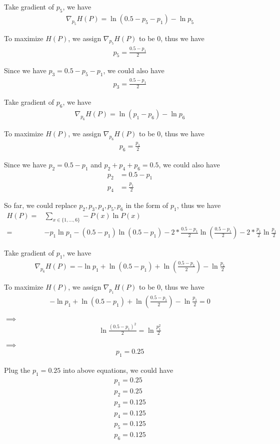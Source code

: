 \documentclass[twoside,11pt]{homework}
\begin{document}
Take gradient of $p_5$, we have 
\begin{align*}
\nabla_{p_5}H(P) = \ln(0.5 - p_5 - p_1) - \ln p_5
\end{align*}

To maximize $H(P)$, we assign $\nabla_{p_5}H(P)$ to be 0, thus we have 
\begin{align*}
p_5 = \frac {0.5 - p_1}{ 2}
\end{align*}


Since we have $p_3 = 0.5 - p_5 - p_1$, we could also have 
\begin{align*}
p_3 = \frac {0.5 - p_1}{ 2}
\end{align*}


Take gradient of $p_6$, we have 
\begin{align*}
\nabla_{p_6}H(P) = \ln(p_1 - p_6) - \ln p_6
\end{align*}

To maximize $H(P)$, we assign $\nabla_{p_6}H(P)$ to be 0, thus we have 
\begin{align*}
p_6 = \frac { p_1}{ 2}
\end{align*}

Since we have $p_2 = 0.5 - p_1$ and $p_2 + p_4 + p_6 = 0.5$, we could also have 
\begin{align*}
p_2 &= 0.5 - p_1 \\
p_4 &= \frac {p_1}{2}
\end{align*}

So far, we could replace $p_2, p_3, p_4, p_5, p_6$ in the form of $p_1$, thus we have 
\begin{align*}
H(P) =& \sum _{x \in \{1, ..., 6\}} - P(x) \ln P(x) \\
 = & - p_1 \ln p_1  - (0.5 - p_1) \ln (0.5 - p_1)- 2*\frac{0.5 - p_1}{2} \ln(\frac{0.5 - p_1}{2}) - 2*\frac{p_1}{2}\ln\frac{p_1}{2}
\end{align*}

Take gradient of $p_1$, we have 
\begin{align*}
\nabla_{p_6}H(P) = -\ln{p_1} + \ln (0.5 - p_1) + \ln (\frac{0.5-p_1}{2}) - \ln \frac{p_1}{2}
\end{align*}

To maximize $H(P)$, we assign $\nabla_{p_1}H(P)$ to be 0, thus we have 
\begin{align*}
-\ln{p_1} + \ln (0.5 - p_1) + \ln (\frac{0.5-p_1}{2}) - \ln \frac{p_1}{2} = 0
\end{align*}

$\implies$ 
\begin{align*}
\ln \frac {(0.5 - p_1)^2}{2} = \ln \frac{p_1^2}{2}
\end{align*}

$\implies$ 
\begin{align*}
p_1 = 0.25
\end{align*}

Plug the $p_1 = 0.25$ into above equations, we could have 
\begin{align*}
p_1 = 0.25 \\
p_2 =  0.25 \\
p_3 = 0.125 \\
p_4 =  0.125 \\
p_5 = 0.125 \\
p_6 =  0.125
\end{align*}
\end{document}
